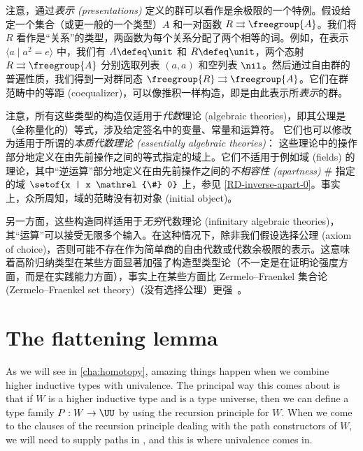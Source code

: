 %
注意，通过\emph{表示 (presentations)} 定义的群可以看作是余极限的一个特例。假设给定一个集合（或更一般的一个类型）$A$ 和一对函数 $R\rightrightarrows \freegroup{A}$。我们将 $R$ 看作是“关系”的类型，两函数为每个关系分配了两个相等的词。例如，在表示 $\langle a \mid a^2 = e \rangle$ 中，我们有 $A\defeq \unit$ 和 $R\defeq \unit$，两个态射 $R\rightrightarrows \freegroup{A}$ 分别选取列表 $(a,a)$ 和空列表 $\nil$。然后通过自由群的普遍性质，我们得到一对群同态 $\freegroup{R} \rightrightarrows \freegroup{A}$。它们在群范畴中的等距 (coequalizer)，可以像推积一样构造，即是由此表示所\emph{表示}的群。

\mentalpause

注意，所有这些类型的构造仅适用于\emph{代数}理论 (algebraic theories)，即其公理是（全称量化的）等式，涉及给定签名中的变量、常量和运算符。 它们也可以修改为适用于所谓的\emph{本质代数理论 (essentially algebraic theories)}： 这些理论中的操作部分地定义在由先前操作之间的等式指定的域上。它们不适用于例如域 (fields) 的理论，其中“逆运算”部分地定义在由先前操作之间的\emph{不相容性 (apartness)} $\#$ 指定的域 $\setof{x | x \mathrel{\#} 0}$ 上，参见 \cref{RD-inverse-apart-0}。事实上，众所周知，域的范畴没有初对象 (initial object)。%

另一方面，这些构造同样适用于\emph{无穷}代数理论 (infinitary algebraic theories)，其“运算”可以接受无限多个输入。在这种情况下，除非我们假设选择公理 (axiom of choice)，否则可能不存在作为简单商的自由代数或代数余极限的表示。这意味着高阶归纳类型在某些方面显著加强了构造型类型论（不一定是在证明论强度方面，而是在实践能力方面），事实上在某些方面比 Zermelo--Fraenkel 集合论 (Zermelo--Fraenkel set theory)（没有选择公理）更强~\cite{blass:freealg}。


\section{The flattening lemma}
\label{sec:flattening}

As we will see in \cref{cha:homotopy}, amazing things happen when we combine higher inductive types with univalence.
The principal way this comes about is that if $W$ is a higher inductive type and \UU is a type universe, then we can define a type family $P:W\to \UU$ by using the recursion principle for $W$.
When we come to the clauses of the recursion principle dealing with the path constructors of $W$, we will need to supply paths in \UU, and this is where univalence comes in.

